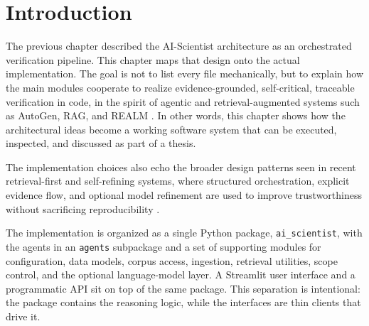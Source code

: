 \section{Introduction }

The previous chapter described the AI-Scientist architecture as an orchestrated verification pipeline. This chapter
maps that design onto the actual implementation. The goal is not to list every file mechanically, but to explain
how the main modules cooperate to realize evidence-grounded, self-critical, traceable verification in code, in the
spirit of agentic and retrieval-augmented systems such as AutoGen, RAG, and REALM \cite{wu2023autogen,lewis2020rag,guu2020realm}. In
other words, this chapter shows how the architectural ideas become a working software system that can be executed,
inspected, and discussed as part of a thesis.

The implementation choices also echo the broader design patterns seen in recent retrieval-first and self-refining
systems, where structured orchestration, explicit evidence flow, and optional model refinement are used to improve
trustworthiness without sacrificing reproducibility \cite{shinn2023reflexion,yao2023treeofthoughts,asai2024selfrag}.

The implementation is organized as a single Python package, \texttt{ai\_scientist}, with the agents in an
\texttt{agents} subpackage and a set of supporting modules for configuration, data models, corpus access,
ingestion, retrieval utilities, scope control, and the optional language-model layer. A Streamlit user interface
and a programmatic API sit on top of the same package. This separation is intentional: the package contains the
reasoning logic, while the interfaces are thin clients that drive it.

